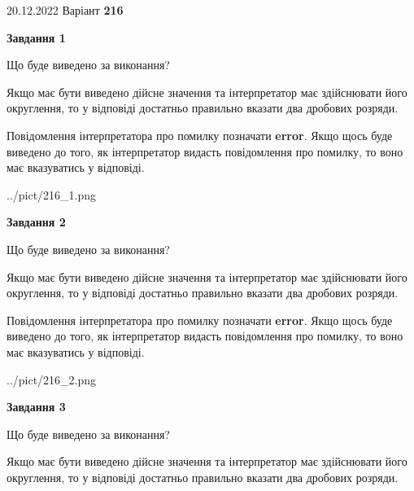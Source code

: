 \documentclass[12pt, ukrainian]{article}
\begin{document}
{20.12.2022 Варіант \No \textbf { 216 }\par}
{
\begin {Large}

{\begin {center}\textbf{Завдання 1}\end {center}}\par
Що буде виведено за виконання? \par

Якщо має бути виведено дійсне значення та інтерпретатор має здійснювати його округлення, 
то у відповіді достатньо правильно вказати два дробових розряди.

Повідомлення інтерпретатора про помилку позначати \textbf{error}.
Якщо щось буде виведено до того, як інтерпретатор видасть повідомлення про помилку, 
то воно має вказуватись у відповіді. \par

\begin{center}
	{../pict/216_1.png}
\end{center}
\newpage

{\begin {center}\textbf{Завдання 2}\end {center}}\par
Що буде виведено за виконання? \par

Якщо має бути виведено дійсне значення та інтерпретатор має здійснювати його округлення, 
то у відповіді достатньо правильно вказати два дробових розряди.

Повідомлення інтерпретатора про помилку позначати \textbf{error}.
Якщо щось буде виведено до того, як інтерпретатор видасть повідомлення про помилку, 
то воно має вказуватись у відповіді. \par

\begin{center}
	{../pict/216_2.png}
\end{center}
\newpage

{\begin {center}\textbf{Завдання 3}\end {center}}\par
Що буде виведено за виконання? \par

Якщо має бути виведено дійсне значення та інтерпретатор має здійснювати його округлення, 
то у відповіді достатньо правильно вказати два дробових розряди.


\end{Large}}
\end{document}

